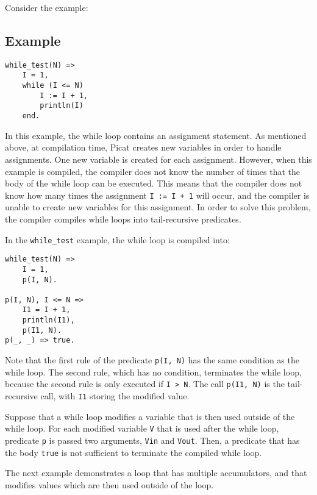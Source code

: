 Consider the example:
\subsection*{Example}
\begin{verbatim}
while_test(N) =>
    I = 1,
    while (I <= N)
        I := I + 1,
        println(I)
    end.
\end{verbatim}
In this example, the while loop contains an assignment statement.  As mentioned above, at compilation time, Picat creates new variables in order to handle assignments.  One new variable is created for each assignment.  However, when this example is compiled, the compiler does not know the number of times that the body of the while loop can be executed.  This means that the compiler does not know how many times the assignment \texttt{I := I + 1} will occur, and the compiler is unable to create new variables for this assignment.  In order to solve this problem, the compiler compiles while loops into tail-recursive predicates.

In the \texttt{while\_test} example, the while loop is compiled into:
\begin{verbatim}
while_test(N) =>
    I = 1,
    p(I, N).

p(I, N), I <= N => 
    I1 = I + 1,
    println(I1),
    p(I1, N).
p(_, _) => true. 
\end{verbatim}

Note that the first rule of the predicate \texttt{p(I, N)} has the same condition as the while loop.  The second rule, which has no condition, terminates the while loop, because the second rule is only executed if \texttt{I > N}.  The call \texttt{p(I1, N)} is the tail-recursive call, with \texttt{I1} storing the modified value.

Suppose that a while loop modifies a variable that is then used outside of the while loop.   For each modified variable \texttt{V} that is used after the while loop, predicate \texttt{p} is passed two arguments, \texttt{Vin} and \texttt{Vout}.  Then, a predicate that has the body \texttt{true} is not sufficient to terminate the compiled while loop. 

The next example demonstrates a loop that has multiple accumulators, and that modifies values which are then used outside of the loop.
